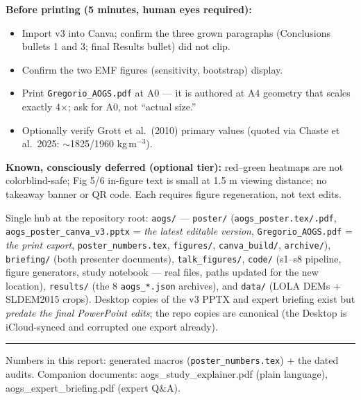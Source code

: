 \documentclass[11pt]{article}
\newcommand{\shead}[1]{\medskip\noindent{\color{teal}\large\bfseries #1}\par\nobreak\smallskip}
\begin{document}
\textbf{Before printing (5 minutes, human eyes required):}
\begin{itemize}
  \item Import v3 into Canva; confirm the three grown paragraphs
        (Conclusions bullets 1 and 3; final Results bullet) did not clip.
  \item Confirm the two EMF figures (sensitivity, bootstrap) display.
  \item Print \texttt{Gregorio\_AOGS.pdf} at A0 --- it is authored at A4
        geometry that scales exactly 4$\times$; ask for A0, not ``actual
        size.''
  \item Optionally verify Grott et al.\ (2010) primary values (quoted via
        Chaste et al.\ 2025: $\sim$1825/1960 kg\,m$^{-3}$).
\end{itemize}

\textbf{Known, consciously deferred (optional tier):} red--green heatmaps
are not colorblind-safe; Fig 5/6 in-figure text is small at 1.5 m viewing
distance; no takeaway banner or QR code. Each requires figure regeneration,
not text edits.

\shead{6\enspace Where everything lives}
Single hub at the repository root: \texttt{aogs/} --- \texttt{poster/}
(\texttt{aogs\_poster.tex/.pdf}, \texttt{aogs\_poster\_canva\_v3.pptx}
= \emph{the latest editable version}, \texttt{Gregorio\_AOGS.pdf} =
\emph{the print export}, \texttt{poster\_numbers.tex}, \texttt{figures/},
\texttt{canva\_build/}, \texttt{archive/}), \texttt{briefing/} (both
presenter documents), \texttt{talk\_figures/}, \texttt{code/} (s1--s8
pipeline, figure generators, study notebook --- real files, paths updated
for the new location), \texttt{results/} (the 8 \texttt{aogs\_*.json}
archives), and \texttt{data/} (LOLA DEMs + SLDEM2015 crops). Desktop
copies of the v3 PPTX and expert briefing exist but \emph{predate the
final PowerPoint edits}; the repo copies are canonical (the Desktop is
iCloud-synced and corrupted one export already).

\vspace{4pt}
{\color{teal}\rule{\linewidth}{0.9pt}}
\begin{center}\footnotesize\color{dim}
Numbers in this report: generated macros (\texttt{poster\_numbers.tex}) +
the dated audits. Companion documents: aogs\_study\_explainer.pdf (plain
language), aogs\_expert\_briefing.pdf (expert Q\&A).
\end{center}
\end{document}
